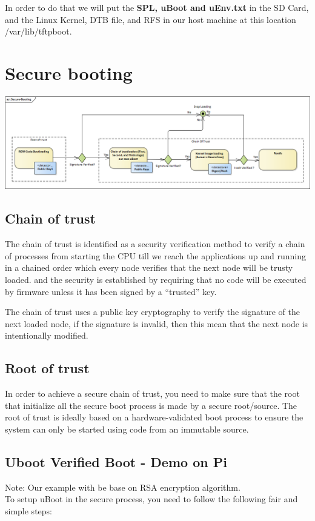 \documentclass{article}
\begin{document}
In order to do that we will put the \textbf{SPL, uBoot and uEnv.txt} in the SD Card, and the Linux Kernel, DTB file, and RFS in our host machine at this location /var/lib/tftpboot. \\

\section{Secure booting}

\begin{center}
    \includegraphics[scale=0.40]{./resources/img/Secure-Booting.png}
\end{center}

\subsection{Chain of trust}

The chain of trust is identified as a security verification method to verify a chain of processes from starting the CPU till we reach the applications up and running in a chained order which every node verifies that the next node will be trusty loaded. and the security is established by requiring that no code will be executed by firmware unless it has been signed by a “trusted” key.

The chain of trust uses a public key cryptography to verify the signature of the next loaded node, if the signature is invalid, then this mean that the next node is intentionally modified. 

\subsection{Root of trust}
In order to achieve a secure chain of trust, you need to make sure that the root that initialize all the secure boot process is made by a secure root/source. The root of trust is ideally based on a hardware-validated boot process to ensure the system can only be started using code from an immutable source. 

\subsection{Uboot Verified Boot - Demo on Pi}
Note: Our example with be base on RSA encryption algorithm.\\
To setup uBoot in the secure process, you need to follow the following fair and simple steps:
\end{document}

